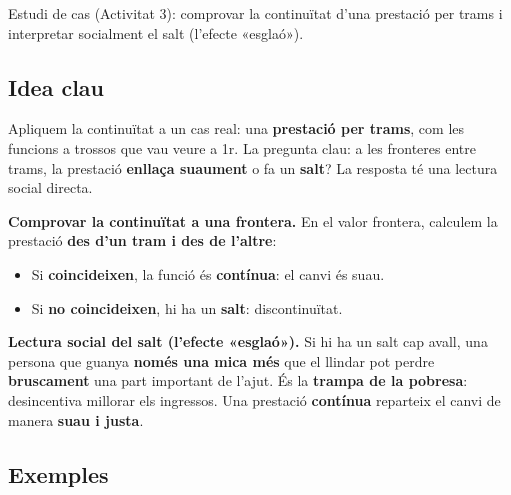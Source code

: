 %
{Estudi de cas (Activitat 3): comprovar la continuïtat d'una prestació per trams i interpretar socialment el salt (l'efecte «esglaó»).}

\subsection{Idea clau}

Apliquem la continuïtat a un cas real: una \textbf{prestació per trams}, com les
funcions a trossos que vau veure a 1r. La pregunta clau: a les fronteres entre trams,
la prestació \textbf{enllaça suaument} o fa un \textbf{salt}? La resposta té una
lectura social directa.

\begin{idea}
\textbf{Comprovar la continuïtat a una frontera.} En el valor frontera, calculem la
prestació \textbf{des d'un tram i des de l'altre}:
\begin{itemize}[leftmargin=1.4em, itemsep=2pt]
  \item Si \textbf{coincideixen}, la funció és \textbf{contínua}: el canvi és suau.
  \item Si \textbf{no coincideixen}, hi ha un \textbf{salt}: discontinuïtat.
\end{itemize}
\textbf{Lectura social del salt (l'efecte «esglaó»).} Si hi ha un salt cap avall, una
persona que guanya \textbf{només una mica més} que el llindar pot perdre
\textbf{bruscament} una part important de l'ajut. És la \textbf{trampa de la pobresa}:
desincentiva millorar els ingressos. Una prestació \textbf{contínua} reparteix el
canvi de manera \textbf{suau i justa}.
\end{idea}

\subsection{Exemples}

